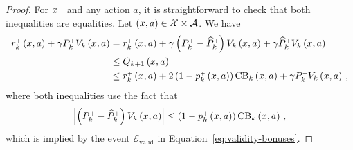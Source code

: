 \begin{proof}
    For $x^\upplus$ and any action $a$, it is straightforward to check that both inequalities are equalities. Let $\spr{x, a} \in \cX \times \cA$. We have
    \begin{align*}
        r_k^\upplus \spr{x, a} + \gamma \opPplusk V_k \spr{x, a} &= r_k^\upplus \spr{x, a} + \gamma \spr{\opPplusk - \ophPplusk} V_k \spr{x, a} + \gamma \ophPplusk V_k \spr{x, a} \\
        &\leq Q_{k+1} \spr{x, a} \\
        &\leq r_k^\upplus \spr{x, a} + 2 \spr{1 - p_k^\upplus \spr{x, a}} \CB_k \spr{x, a} + \gamma \opPplusk V_k \spr{x, a}\,,
    \end{align*}
    where both inequalities use the fact that
    \begin{equation*}
        \abs{\spr{\opPplusk - \ophPplusk} V_k \spr{x, a}} \leq \spr{1 - p_k^\upplus \spr{x, a}} \CB_k \spr{x, a}\,,
    \end{equation*}
    which is implied by the event $\mathcal{E}_{\mathrm{valid}}$ in Equation~\ref{eq:validity-bonuses}.
\end{proof}

\boundregretplus*

